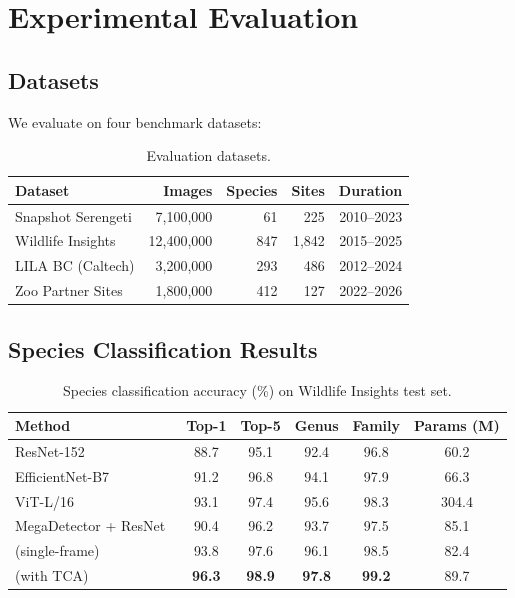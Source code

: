 \section{Experimental Evaluation}


\subsection{Datasets}

We evaluate on four benchmark datasets:

\begin{table}[htbp]
\centering
\caption{Evaluation datasets.}
\label{tab:datasets}
\begin{tabular}{lrrrr}
\toprule
\textbf{Dataset} & \textbf{Images} & \textbf{Species} & \textbf{Sites} & \textbf{Duration} \\
\midrule
Snapshot Serengeti & 7,100,000 & 61 & 225 & 2010--2023 \\
Wildlife Insights & 12,400,000 & 847 & 1,842 & 2015--2025 \\
LILA BC (Caltech) & 3,200,000 & 293 & 486 & 2012--2024 \\
Zoo Partner Sites & 1,800,000 & 412 & 127 & 2022--2026 \\
\bottomrule
\end{tabular}
\end{table}

\subsection{Species Classification Results}

\begin{table}[htbp]
\centering
\caption{Species classification accuracy (\%) on Wildlife Insights test set.}
\label{tab:classification}
\begin{tabular}{lccccc}
\toprule
\textbf{Method} & \textbf{Top-1} & \textbf{Top-5} & \textbf{Genus} & \textbf{Family} & \textbf{Params (M)} \\
\midrule
ResNet-152~\cite{norouzzadeh2018} & 88.7 & 95.1 & 92.4 & 96.8 & 60.2 \\
EfficientNet-B7~\cite{tan2019} & 91.2 & 96.8 & 94.1 & 97.9 & 66.3 \\
ViT-L/16~\cite{dosovitskiy2021} & 93.1 & 97.4 & 95.6 & 98.3 & 304.4 \\
MegaDetector + ResNet~\cite{beery2019mega} & 90.4 & 96.2 & 93.7 & 97.5 & 85.1 \\
\midrule
\ConservAI{} (single-frame) & 93.8 & 97.6 & 96.1 & 98.5 & 82.4 \\
\ConservAI{} (with TCA) & \textbf{96.3} & \textbf{98.9} & \textbf{97.8} & \textbf{99.2} & 89.7 \\
\bottomrule
\end{tabular}
\end{table}

